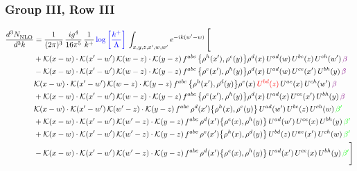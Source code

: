 \documentclass[9pt]{article}
\numberwithin{equation}{section}
\begin{document}
\subsubsection{Group III, Row III} 
\begin{align}
     \frac{d^{3}N_{\rm NLO}^{\rm}}{d^{3}k}  & = \frac{1}{(2\pi)^{3}}\, \frac{ig^{4}}{16\pi^{5}}\, \frac{1}{k^{+}}\, {\color{blue}\log{\left[\frac{k^{+}}{\Lambda}\right]}}\, \int_{x,y,z,x^{\prime},w,w^{\prime}}e^{-ik(w^{\prime}-w)}\, \Bigg[\notag \\ & +\mathcal{K}(x-w)\cdot\mathcal{K}(x'-w')\,\mathcal{K}(w-z)\cdot\mathcal{K}(y-z)\, f^{abc}\,\big\{\rho^{h}(x'),\rho^{e}(y)\big\}\rho^{d}(x)\,U^{ad}(w)\,U^{be}(z)\,U^{ch}(w')\,{\color{violet}\beta}\notag\\
&-\mathcal{K}(x-w)\cdot\mathcal{K}(x'-w')\,\mathcal{K}(w-z)\cdot\mathcal{K}(y-z)\, f^{abc}\,\big\{\rho^{e}(x'),\rho^{h}(y)\big\}\rho^{d}(x)\,U^{ad}(w)\,U^{ce}(x')\,U^{bh}(y)\,{\color{violet}\beta}\notag\\ &\-\mathcal{K}(x-w)\cdot\mathcal{K}(x'-w')\,\mathcal{K}(w-z)\cdot\mathcal{K}(y-z)\, f^{abc}\,\big\{\rho^{h}(x'),\rho^{d}(y)\big\}\rho^{e}(x)\,{\color{red}U^{bd}(z)}\,U^{ae}(x)\,U^{ch}(w')\,{\color{violet}\beta}\notag\\ & +\mathcal{K}(x-w)\cdot\mathcal{K}(x'-w')\,\mathcal{K}(w-z)\cdot\mathcal{K}(y-z)\, f^{abc}\,\big\{\rho^{e}(x'),\rho^{h}(y)\big\}\rho^{d}(x)\,U^{ad}(x)\,U^{ce}(x')\,U^{bh}(y)\,{\color{violet}\beta}\notag\\ &\-\mathcal{K}(x-w)\cdot\mathcal{K}(x'-w')\,\mathcal{K}(w'-z)\cdot\mathcal{K}(y-z)\, f^{abc}\,\rho^{d}(x')\big\{\rho^{h}(x),\rho^{e}(y)\big\}\,U^{ad}(w')\,U^{be}(z)\,U^{ch}(w)\,{\color{green}\beta'}\notag\\ &+\mathcal{K}(x-w)\cdot\mathcal{K}(x'-w')\,\mathcal{K}(w'-z)\cdot\mathcal{K}(y-z)\, f^{abc}\,\rho^{d}(x')\big\{\rho^{e}(x),\rho^{h}(y)\big\}\,U^{ad}(w')\,U^{ce}(x)\,U^{bh}(y)\,{\color{green}\beta'} \notag\\ & +\mathcal{K}(x-w)\cdot\mathcal{K}(x'-w')\,\mathcal{K}(w'-z)\cdot\mathcal{K}(y-z)\, f^{abc}\,\rho^{e}(x')\big\{\rho^{h}(x),\rho^{d}(y)\big\}\,U^{bd}(z)\,U^{ae}(x')\,U^{ch}(w)\,{\color{green}\beta'} \notag\\ & -\mathcal{K}(x-w)\cdot\mathcal{K}(x'-w')\,\mathcal{K}(w'-z)\cdot\mathcal{K}(y-z)\, f^{abc}\,\rho^{d}(x')\big\{\rho^{e}(x),\rho^{h}(y)\big\}\,U^{ad}(x')\,U^{ce}(x)\,U^{bh}(y)\,{\color{green}\beta'}\Bigg]\end{align}     
\end{document}
